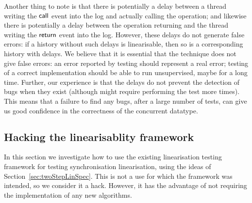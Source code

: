Another thing to note is that there is potentially a delay between a thread
writing the $\mathsf{call}$ event into the log and actually calling the operation; and
likewise there is potentially a delay between the operation returning and the
thread writing the $\mathsf{return}$ event into the log.  However, these delays do not
generate false errors: if a history without such delays is linearisable, then
so is a corresponding history with delays.  We believe that it is essential
that the technique does not give false errors: an error reported by testing
should represent a real error; testing of a correct implementation should be
able to run unsupervised, maybe for a long time.  Further, our experience is
that the delays do not prevent the detection of bugs when they exist (although
might require performing the test more times).  This means that a failure to
find any bugs, after a large number of tests, can give us good confidence in
the correctness of the concurrent datatype.






\subsection{Hacking the linearisablity framework}


In this section we investigate how to use the existing linearisation testing
framework for testing synchronisation linearisation, using the ideas of
Section~\ref{sec:twoStepLinSpec}.  This is not a use for which the framework
was intended, so we consider it a hack.  However, it has the advantage of not
requiring the implementation of any new algorithms.

